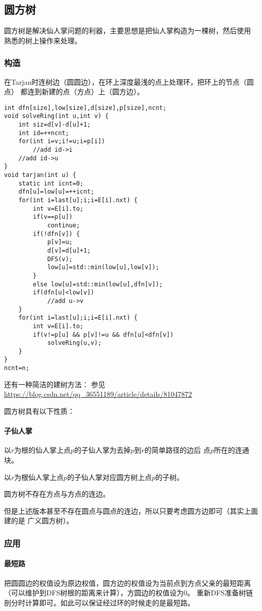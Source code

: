 \subsection{圆方树}
圆方树是解决仙人掌问题的利器，主要思想是把仙人掌构造为一棵树，然后使用
熟悉的树上操作来处理。
\subsubsection{构造}
在Tarjan时连树边（圆圆边），在环上深度最浅的点上处理环，把环上的节点（圆点）
都连到新建的点（方点）上（圆方边）。

\begin{lstlisting}
int dfn[size],low[size],d[size],p[size],ncnt;
void solveRing(int u,int v) {
    int siz=d[v]-d[u]+1;
    int id=++ncnt;
    for(int i=v;i!=u;i=p[i])
        //add id->i
    //add id->u
}
void tarjan(int u) {
    static int icnt=0;
    dfn[u]=low[u]=++icnt;
    for(int i=last[u];i;i=E[i].nxt) {
        int v=E[i].to;
        if(v==p[u])
            continue;
        if(!dfn[v]) {
            p[v]=u;
            d[v]=d[u]+1;
            DFS(v);
            low[u]=std::min(low[u],low[v]);
        }
        else low[u]=std::min(low[u],dfn[v]);
        if(dfn[u]<low[v])
            //add u->v
    }
    for(int i=last[u];i;i=E[i].nxt) {
        int v=E[i].to;
        if(v!=p[u] && p[v]!=u && dfn[u]<dfn[v])
            solveRing(u,v);
    }
}
ncnt=n;
\end{lstlisting}

还有一种简洁的建树方法：
参见\url{https://blog.csdn.net/qq\_36551189/article/details/81047872}

圆方树具有以下性质：
\paragraph{子仙人掌} 以$r$为根的仙人掌上点$p$的子仙人掌为去掉$p$到$r$的简单路径的边后
点$p$所在的连通块。
\begin{property}
    以$r$为根仙人掌上点$p$的子仙人掌对应圆方树上点$p$的子树。
\end{property}
\begin{property}
    圆方树不存在方点与方点的连边。
\end{property}
但是上述版本甚至不存在圆点与圆点的连边，所以只要考虑圆方边即可（其实上面建的是
广义圆方树）。
\subsubsection{应用}
\paragraph{最短路}
把圆圆边的权值设为原边权值，圆方边的权值设为当前点到方点父亲的最短距离
（可以维护到DFS树根的距离来计算），方圆边的权值设为0。
重新DFS准备树链剖分时计算即可。如此可以保证经过环的时候走的是最短路。

